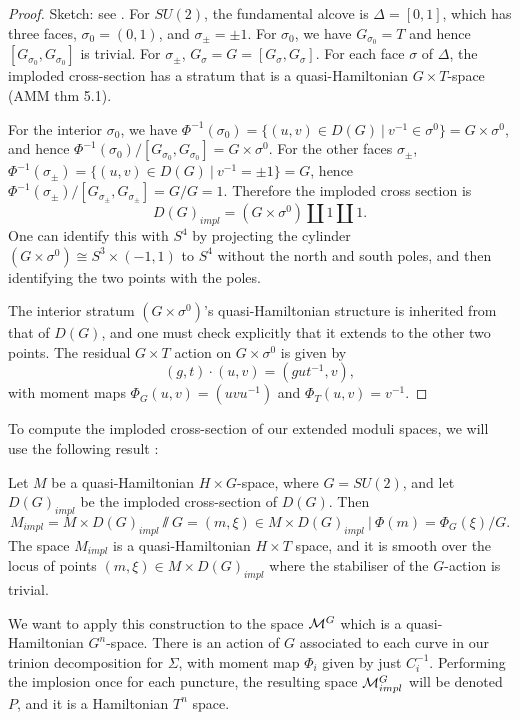 	\begin{proof}
		Sketch: see \cite[prop 2.29]{hurtubise_representations_2000}. For $SU(2)$, the fundamental alcove is $\Delta = [0,1]$, which has three faces, $\sigma_0 = (0,1)$, and $\sigma_{\pm} = \pm1$. For $\sigma_0$, we have $G_{\sigma_0} = T$ and hence $[G_{\sigma_0}, G_{\sigma_0}]$ is trivial. For $\sigma_\pm$, $G_\sigma = G = [G_\sigma,G_\sigma]$. For each face $\sigma$ of $\Delta$, the imploded cross-section has a stratum that is a quasi-Hamiltonian $G\times T$-space (AMM thm 5.1).
		
		For the interior $\sigma_0$, we have $\Phi^{-1}(\sigma_0) = \{(u,v)\in D(G)~|~ v^{-1}\in \sigma^0\} = G \times \sigma^0$, and hence $\Phi^{-1}(\sigma_0)/[G_{\sigma_0},G_{\sigma_0}] = G\times \sigma^0$. For the other faces $\sigma_{\pm}$, $\Phi^{-1}(\sigma_\pm) = \{(u,v)\in D(G)~|~ v^{-1} = \pm 1\} = G$, hence $\Phi^{-1}(\sigma_\pm)/[G_{\sigma_\pm},G_{\sigma_\pm}] = G/G = 1$. Therefore the imploded cross section is
		\begin{equation}
			D(G)_{impl} = (G\times \sigma^0) \coprod {1} \coprod {1}.
		\end{equation}
		One can identify this with $S^4$ by projecting the cylinder $(G\times \sigma^0) \cong S^3\times (-1,1)$ to $S^4$ without the north and south poles, and then identifying the two points with the poles. 
		
		The interior stratum $(G\times \sigma^0)$'s quasi-Hamiltonian structure is inherited from that of $D(G)$, and one must check explicitly that it extends to the other two points. The residual $G\times T$ action on $G\times \sigma^0$ is given by
		\begin{equation}
			(g,t)\cdot (u,v) = (gut^{-1},v),
		\end{equation}
		with moment maps $\Phi_G(u,v) = (uvu^{-1})$ and $\Phi_T(u,v) = v^{-1}$.
	\end{proof}
	To compute the imploded cross-section of our extended moduli spaces, we will use the following result \cite[Prop 2.32]{hurtubise_representations_2000}:
	\begin{theorem}
		Let $M$ be a quasi-Hamiltonian $H\times G$-space, where $G=SU(2)$, and let $D(G)_{impl}$ be the imploded cross-section of $D(G)$. Then
		\begin{equation}
			M_{impl} = M\times D(G)_{impl}\sslash G = {(m,\xi)\in M\times D(G)_{impl}~|~\Phi(m)=\Phi_G(\xi)}/G.
		\end{equation}
		The space $M_{impl}$ is a quasi-Hamiltonian $H\times T$ space, and it is smooth over the locus of points $(m,\xi)\in M\times D(G)_{impl}$ where the stabiliser of the $G$-action is trivial.
	\end{theorem}
	We want to apply this construction to the space $\mathcal{M}^G$ which is a quasi-Hamiltonian $G^n$-space. There is an action of $G$ associated to each curve in our trinion decomposition for $\Sigma$, with moment map $\Phi_i$ given by just $C_i^{-1}$. Performing the implosion once for each puncture, the resulting space $\mathcal{M}^G_{impl}$ will be denoted $P$, and it is a Hamiltonian $T^n$ space.
	

